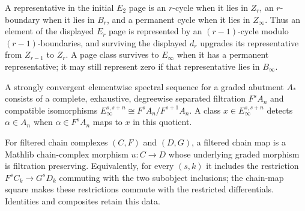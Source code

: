 \begin{definition}
  \label{def:ss-cycle-boundary-permanent}
  \notready
  A representative in the initial $E_2$ page is an $r$-cycle when it lies in
  $Z_r$, an $r$-boundary when it lies in $B_r$, and a permanent cycle when it
  lies in $Z_\infty$.  Thus an element of the displayed $E_r$ page is
  represented by an $(r-1)$-cycle modulo $(r-1)$-boundaries, and surviving
  the displayed $d_r$ upgrades its representative from $Z_{r-1}$ to $Z_r$.
  A page class survives to $E_\infty$ when it has a permanent representative;
  it may still represent zero if that representative lies in $B_\infty$.
\end{definition}

\begin{definition}
  \label{def:strong-convergence-detection}
  \notready
  A strongly convergent elementwise spectral sequence for a graded abutment
  $A_*$ consists of a complete, exhaustive, degreewise separated filtration
  $F^sA_n$ and compatible isomorphisms
  $E_\infty^{s,s+n}\cong F^sA_n/F^{s+1}A_n$.  A class
  $x\in E_\infty^{s,s+n}$ detects $\alpha\in A_n$ when $\alpha\in F^sA_n$
  maps to $x$ in this quotient.
\end{definition}

\begin{definition}
  \label{def:filtered-chain-map}
  \leanok
  For filtered chain complexes $(C,F)$ and $(D,G)$, a filtered chain map is a
  Mathlib chain-complex morphism $u:C\to D$ whose underlying graded morphism is
  filtration preserving.  Equivalently, for every $(s,k)$ it includes the
  restriction $F^sC_k\to G^sD_k$ commuting with the two subobject inclusions;
  the chain-map square makes these restrictions commute with the restricted
  differentials.  Identities and composites retain this data.
\end{definition}

